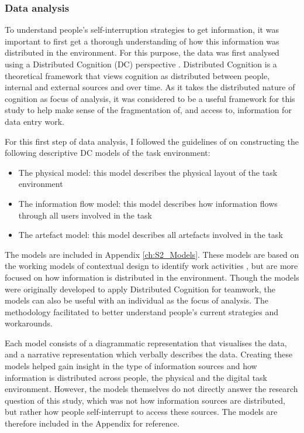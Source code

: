 \subsubsection{Data analysis}
To understand people’s self-interruption strategies to get information, it was important to first get a thorough understanding of how this information was distributed in the environment. For this purpose, the data was first analysed using a Distributed Cognition (DC) perspective \citep{Hutchins1995}. Distributed Cognition is a theoretical framework that views cognition as distributed between people, internal and external sources and over time. As it takes the distributed nature of cognition as focus of analysis, it was considered to be a useful framework for this study to help make sense of the fragmentation of, and access to, information for data entry work. 

For this first step of data analysis, I followed the guidelines of \citet{Furniss2006} on constructing the following descriptive DC models of the task environment:

\begin{itemize}
\item 
The physical model: this model describes the physical layout of the task environment
\item 
The information flow model: this model describes how information flows through all users involved in the task
\item 
The artefact model: this model describes all artefacts involved in the task
\end{itemize}

The models are included in Appendix \ref{ch:S2_Models}. These models are based on the working models of contextual design to identify work activities \citep{Holtzblatt2014}, but are more focused on how information is distributed in the environment. Though the models were originally developed to apply Distributed Cognition for teamwork, the models can also be useful with an individual as the focus of analysis. The methodology facilitated to better understand people’s current strategies and workarounds.

Each model consists of a diagrammatic representation that visualises the data, and a narrative representation which verbally describes the data. Creating these models helped gain insight in the type of information sources and how information is distributed across people, the physical and the digital task environment. However, the models themselves do not directly answer the research question of this study, which was not how information sources are distributed, but rather how people self-interrupt to access these sources. The models are therefore included in the Appendix for reference.

